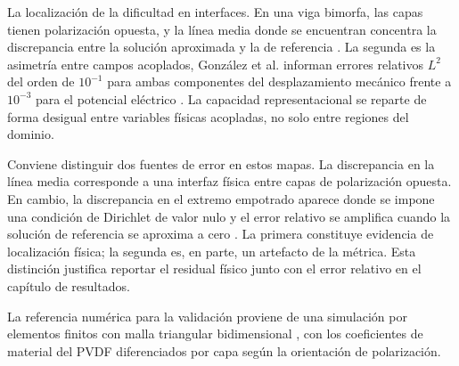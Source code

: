 
La localización de la dificultad en
interfaces. En una viga bimorfa, las capas tienen polarización opuesta, y
la línea media donde se encuentran concentra la discrepancia entre la
solución aproximada y la de referencia \cite{gonzalez2026pinnpiezo}. La
segunda es la asimetría entre campos acoplados,  González et al. informan
errores relativos $L^2$ del orden de $10^{-1}$ para ambas componentes del
desplazamiento mecánico frente a $10^{-3}$ para el potencial eléctrico
\cite{gonzalez2026pinnpiezo}. La capacidad representacional se reparte de
forma desigual entre variables físicas acopladas, no solo entre regiones
del dominio.


Conviene distinguir dos fuentes de error en estos mapas. La discrepancia
en la línea media corresponde a una interfaz física entre capas de
polarización opuesta. En cambio, la discrepancia en el extremo empotrado
aparece donde se impone una condición de Dirichlet de valor nulo y el
error relativo se amplifica cuando la solución de referencia se aproxima
a cero \cite{gonzalez2026pinnpiezo}. La primera constituye evidencia de
localización física; la segunda es, en parte, un artefacto de la métrica.
Esta distinción justifica reportar el residual físico junto con el error
relativo en el capítulo de resultados.

La referencia numérica para la validación proviene de una simulación por
elementos finitos con malla triangular bidimensional
\cite{gonzalez2026pinnpiezo,khan2018bimorph}, con los coeficientes de
material del PVDF diferenciados por capa según la orientación de
polarización.
